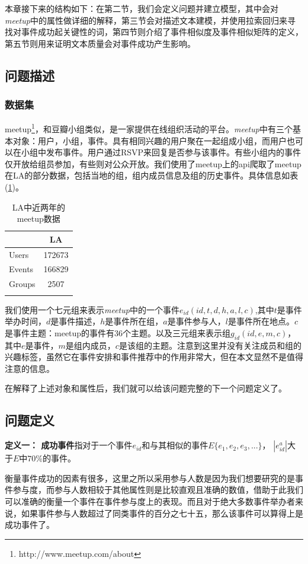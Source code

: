 本章接下来的结构如下：在第二节，我们会定义问题并建立模型，其中会对\textit{meetup}中的属性做详细的解释，第三节会对描述文本建模，并使用拉索回归来寻找对事件成功起关键性的词，第四节则介绍了事件相似度及事件相似矩阵的定义，第五节则用来证明文本质量会对事件成功产生影响。

\subsection{问题描述}
\subsubsection{数据集}

meetup\footnote{http://www.meetup.com/about}，和豆瓣小组类似，是一家提供在线组织活动的平台。\textit{meetup}中有三个基本对象：用户，小组，事件。具有相同兴趣的用户聚在一起组成小组，而用户也可以在小组中发布事件。用户通过RSVP来回复是否参与该事件。有些小组内的事件仅开放给组员参加，有些则对公众开放。我们使用了meetup上的api爬取了meetup在LA的部分数据，包括当地的组，组内成员信息及组的历史事件。具体信息如表(\ref{t1})。

\begin{longtable}[HTBP]{@{}lc@{}}
\toprule
& LA\tabularnewline
\midrule
\endhead
Users & 172673\tabularnewline
Events & 166829\tabularnewline
Groups & 2507\tabularnewline
\bottomrule
\caption{LA中近两年的meetup数据}
\label{t1}

\end{longtable}

我们使用一个七元组来表示\textit{meetup}中的一个事件\(e_{id}(id,t,d,h,a,l,c)\),其中\(t\)是事件举办时间，\(d\)是事件描述，\(h\)是事件所在组，\(a\)是事件参与人，\(l\)是事件所在地点。\(c\)是事件主题：meetup的事件有36个主题。以及三元组来表示组\(g_{id}(id,e,m,c)\)，其中\(e\)是事件，\(m\)是组内成员，\(c\)是该组的主题。注意到这里并没有关注成员和组的兴趣标签，虽然它在事件安排和事件推荐中的作用非常大，但在本文显然不是值得注意的信息。

在解释了上述对象和属性后，我们就可以给该问题完整的下一个问题定义了。

\subsection{问题定义}
\textbf{定义一： 成功事件}指对于一个事件\(e_{id}\)和与其相似的事件\(E\{e_1,e_2,e_3,...\}\)，
\(|e_{id}^a|\)大于\(E\)中\(70\)\%的事件。

衡量事件成功的因素有很多，这里之所以采用参与人数是因为我们想要研究的是事件参与度，而参与人数相较于其他属性则是比较直观且准确的数值，借助于此我们可以准确的衡量一个事件在事件参与度上的表现。而且对于绝大多数事件举办者来说，如果事件参与人数超过了同类事件的百分之七十五，那么该事件可以算得上是成功事件了。

